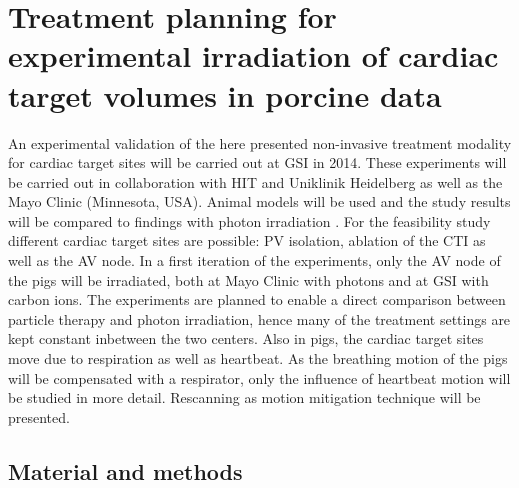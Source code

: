 \documentclass[type=dr, dr=rernat, accentcolor=tud7b,colorbacktitle, bigchapter, openright, twoside, 12pt ]{tudthesis}
\begin{document}
\dominitoc
\setcounter{tocdepth}{1}
\tableofcontents

\chapter{Treatment planning for experimental irradiation of cardiac target volumes in porcine data}
\minitoc


An experimental validation of the here presented non-invasive treatment modality for cardiac target sites will be carried out at GSI in 2014.
These experiments will be carried out in collaboration with HIT and Uniklinik Heidelberg as well as the Mayo 
Clinic (Minnesota, USA). Animal models will be used and the study results will be compared to findings with photon irradiation \cite{Sha10} 
\cite{Bla13}. For the feasibility study different cardiac target sites are possible: PV isolation, ablation of the CTI as well as the AV node. 
In a first iteration of the experiments, only the AV node of the pigs will be irradiated, both at Mayo Clinic with photons and at GSI with 
carbon ions. The experiments are planned to enable a direct comparison between particle therapy and photon irradiation, hence many of the 
treatment settings are kept constant inbetween the two centers. Also in pigs, the cardiac target sites move 
due to respiration as well as heartbeat. As the breathing motion of the pigs will be compensated with a respirator, only the influence of 
heartbeat motion will be studied in more detail. Rescanning as motion mitigation technique will be presented.


\section{Material and methods}
\end{document}
